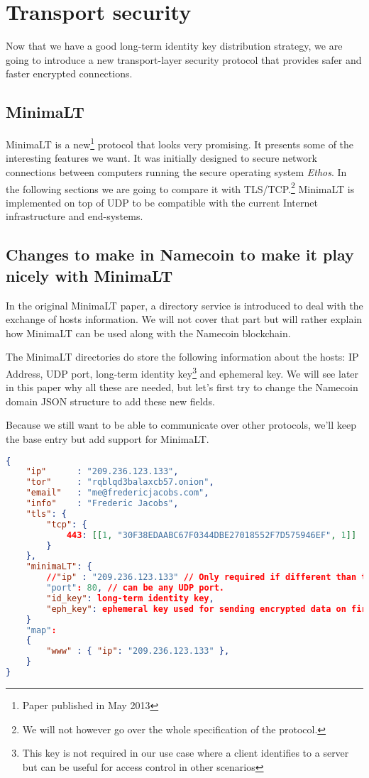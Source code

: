 \documentclass{vldb}
\begin{document}
\section{Transport security}

Now that we have a good long-term identity key distribution strategy, we are going to introduce a new transport-layer security protocol that provides safer and faster encrypted connections.
\subsection{MinimaLT}
MinimaLT\cite{MinimaLT} is a new\footnote{Paper published in May 2013} protocol that looks very promising.
It presents some of the interesting features we want. It was initially designed to secure network connections between computers running the secure operating system \emph{Ethos}. In the following sections we are going to compare it with TLS/TCP.\footnote{We will not however go over the whole specification of the protocol.} 
MinimaLT is implemented on top of UDP to be compatible with the current Internet infrastructure and end-systems.

\subsection{Changes to make in Namecoin to make it play nicely with MinimaLT}

In the original MinimaLT paper, a directory service is introduced to deal with the exchange of hosts information. We will not cover that part but will rather explain how MinimaLT can be used along with the Namecoin blockchain.

The MinimaLT directories do store the following information about the hosts: IP Address, UDP port, long-term identity key\footnote{This key is not required in our use case where a client identifies to a server but can be useful for access control in other scenarios} and ephemeral key. We will see later in this paper why all these are needed, but let's first try to change the Namecoin domain JSON structure to add these new fields. 

Because we still want to be able to communicate over other protocols, we'll keep the base entry but add support for MinimaLT. 

\newpage

\begin{lstlisting}[language=json,firstnumber=1]
{
    "ip"      : "209.236.123.133",
    "tor"     : "rqblqd3balaxcb57.onion",
    "email"   : "me@fredericjacobs.com",
    "info"    : "Frederic Jacobs",
    "tls": {
        "tcp": {
            443: [[1, "30F38EDAABC67F0344DBE27018552F7D575946EF", 1]]
        }
    },
    "minimaLT": {
        //"ip" : "209.236.123.133" // Only required if different than the default one
        "port": 80, // can be any UDP port.
        "id_key": long-term identity key,
        "eph_key": ephemeral key used for sending encrypted data on first RTT.
    }
    "map":
    {
        "www" : { "ip": "209.236.123.133" },
    }
}
\end{lstlisting}
\end{document}
